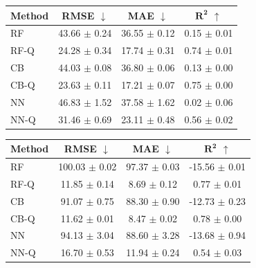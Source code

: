 \begin{table}[t]
    \vspace{1em}

    \begin{minipage}{0.48\textwidth}
        \centering
        \label{tab:ood-rtx5000}
        \begin{tabular}{lccc}
            \toprule
            \textbf{Method} & \textbf{RMSE} $\downarrow$ & \textbf{MAE} $\downarrow$ & $\boldsymbol{R^2}$ $\uparrow$ \\
            \midrule
            RF      & 43.66 $\pm$ 0.24 & 36.55 $\pm$ 0.12 & 0.15 $\pm$ 0.01 \\
            RF-Q    & 24.28 $\pm$ 0.34 & 17.74 $\pm$ 0.31 & 0.74 $\pm$ 0.01 \\
            \midrule
            CB      & 44.03 $\pm$ 0.08 & 36.80 $\pm$ 0.06 & 0.13 $\pm$ 0.00 \\
            CB-Q    & 23.63 $\pm$ 0.11 & 17.21 $\pm$ 0.07 & 0.75 $\pm$ 0.00 \\
            \midrule
            NN      & 46.83 $\pm$ 1.52 & 37.58 $\pm$ 1.62 & 0.02 $\pm$ 0.06 \\
            NN-Q    & 31.46 $\pm$ 0.69 & 23.11 $\pm$ 0.48 & 0.56 $\pm$ 0.02 \\
            \bottomrule
        \end{tabular}
    \end{minipage}
    \hfill
    \begin{minipage}{0.48\textwidth}
        \centering
        \label{tab:ood-rtx4000}
        \begin{tabular}{lccc}
            \toprule
            \textbf{Method} & \textbf{RMSE} $\downarrow$ & \textbf{MAE} $\downarrow$ & $\boldsymbol{R^2}$ $\uparrow$ \\
            \midrule
            RF      & 100.03 $\pm$ 0.02 & 97.37 $\pm$ 0.03 & -15.56 $\pm$ 0.01 \\
            RF-Q    & 11.85 $\pm$ 0.14 & 8.69 $\pm$ 0.12 & 0.77 $\pm$ 0.01 \\
            \midrule
            CB      & 91.07 $\pm$ 0.75 & 88.30 $\pm$ 0.90 & -12.73 $\pm$ 0.23 \\
            CB-Q    & 11.62 $\pm$ 0.01 & 8.47 $\pm$ 0.02 & 0.78 $\pm$ 0.00 \\
            \midrule
            NN      & 94.13 $\pm$ 3.04 & 88.60 $\pm$ 3.28 & -13.68 $\pm$ 0.94 \\
            NN-Q    & 16.70 $\pm$ 0.53 & 11.94 $\pm$ 0.24 & 0.54 $\pm$ 0.03 \\
            \bottomrule
        \end{tabular}
    \end{minipage}
\end{table}